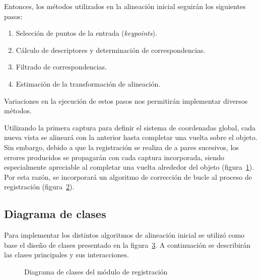 	Entonces, los métodos utilizados en la alineación inicial seguirán los siguientes pasos:
	\begin{enumerate}
		\item Selección de puntos de la entrada (\emph{keypoints}).
		\item Cálculo de descriptores y determinación de correspondencias.
		\item Filtrado de correspondencias.
		\item Estimación de la transformación de alineación.
	\end{enumerate}
	Variaciones en la ejecución de estos pasos nos permitirán implementar diversos métodos.


	Utilizando la primera captura para definir el sistema de coordenadas
	global, cada nueva vista se alineará con la anterior hasta completar una
	vuelta sobre el objeto.  Sin embargo, debido a que la registración se
	realiza de a pares sucesivos, los errores producidos se propagarán con cada
	captura incorporada, siendo especialmente apreciable al completar una
	vuelta alrededor del objeto (figura~\ref{fig:error_bucle}).
	Por esta razón, se incorporará un algoritmo de corrección de bucle al proceso de registración
	(figura~\ref{fig:flow_registracion}).

	\begin{figure}
		\caption{\label{fig:error_bucle}}
	\end{figure}

	\begin{figure}
		\caption{\label{fig:flow_registracion} }
	\end{figure}

	\subsection{Diagrama de clases}
		Para implementar los distintos algoritmos de alineación inicial se utilizó como base
		el diseño de clases presentado en la figura~\ref{fig:align_class}.
		A continuación se describirán las clases principales y sus interacciones.
		\begin{figure}
			\caption{\label{fig:align_class}Diagrama de clases del módulo de registración}
		\end{figure}


